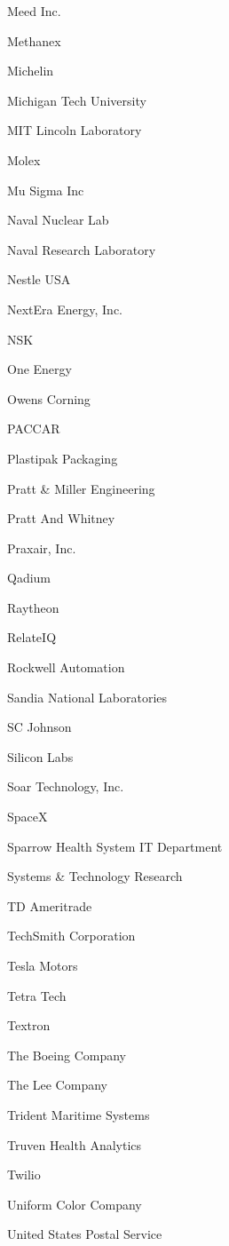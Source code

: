 \documentclass[twoside]{article}
\begin{document}
\begin{center}
\begin{multicols}{5}
\begin{FlushLeft}
\begin{compactitem}
\item Meed Inc.
\item Methanex
\item Michelin
\item Michigan Tech University
\item MIT Lincoln Laboratory
\item Molex
\item Mu Sigma Inc
\item Naval Nuclear Lab
\item Naval Research Laboratory
\item Nestle USA
\item NextEra Energy, Inc.
\item NSK
\item One Energy
\item Owens Corning
\item PACCAR
\item Plastipak Packaging
\item Pratt \& Miller Engineering
\item Pratt And Whitney
\item Praxair, Inc.
\item Qadium
\item Raytheon
\item RelateIQ
\item Rockwell Automation
\item Sandia National Laboratories
\item SC Johnson
\item Silicon Labs
\item Soar Technology, Inc.
\item SpaceX
\item Sparrow Health System IT Department
\item Systems \& Technology Research
\item TD Ameritrade
\item TechSmith Corporation
\item Tesla Motors
\item Tetra Tech
\item Textron
\item The Boeing Company
\item The Lee Company
\item Trident Maritime Systems
\item Truven Health Analytics
\item Twilio
\item Uniform Color Company
\item United States Postal Service

\end{compactitem}
\end{FlushLeft}
\end{multicols}
\end{center}
\end{document}
